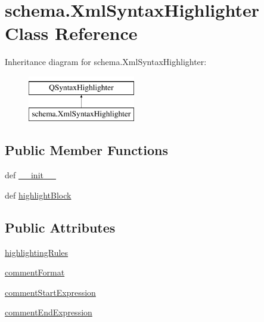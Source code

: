 \hypertarget{classschema_1_1XmlSyntaxHighlighter}{}\section{schema.\+Xml\+Syntax\+Highlighter Class Reference}
\label{classschema_1_1XmlSyntaxHighlighter}
Inheritance diagram for schema.\+Xml\+Syntax\+Highlighter\+:\begin{figure}[H]
\begin{center}
\leavevmode
\includegraphics[height=2.000000cm]{classschema_1_1XmlSyntaxHighlighter}
\end{center}
\end{figure}
\subsection*{Public Member Functions}
\begin{DoxyCompactItemize}
\item 
def \hyperlink{classschema_1_1XmlSyntaxHighlighter_a0e1edb1c8938d61479f6a50e31ba24b7}{\+\_\+\+\_\+init\+\_\+\+\_\+}
\item 
def \hyperlink{classschema_1_1XmlSyntaxHighlighter_a9bc183252d9d348844c4b301860ac4c3}{highlight\+Block}
\end{DoxyCompactItemize}
\subsection*{Public Attributes}
\begin{DoxyCompactItemize}
\item 
\hyperlink{classschema_1_1XmlSyntaxHighlighter_a58fd14a34f42c53d3d720ebe7edc6f61}{highlighting\+Rules}
\item 
\hyperlink{classschema_1_1XmlSyntaxHighlighter_ac10572f683bdd77e11df6b452c390982}{comment\+Format}
\item 
\hyperlink{classschema_1_1XmlSyntaxHighlighter_a5905e85529138adaeca0f4af468ccacd}{comment\+Start\+Expression}
\item 
\hyperlink{classschema_1_1XmlSyntaxHighlighter_aff3e59549326b1a49ce9649cb40670c8}{comment\+End\+Expression}
\end{DoxyCompactItemize}


